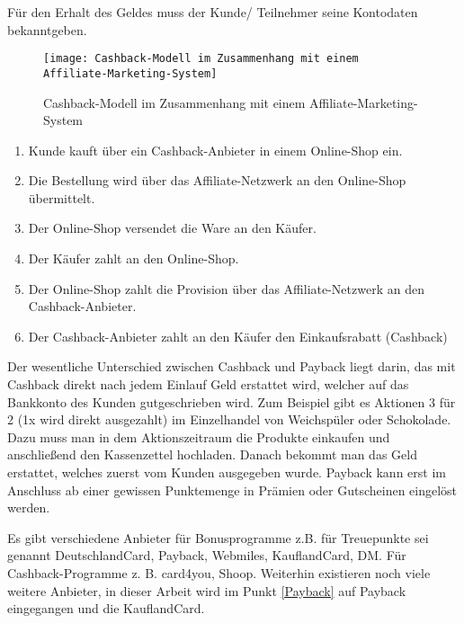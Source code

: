 \noindent Für den Erhalt des Geldes muss der Kunde/ Teilnehmer seine Kontodaten bekanntgeben. \cite{paycashback_all} \newline



\begin{figure}[!ht]
	\centering
	\texttt{[image: Cashback-Modell im Zusammenhang mit einem Affiliate-Marketing-System]}
	\caption{Cashback-Modell im Zusammenhang mit einem Affiliate-Marketing-System \cite{Bonus_affiliate} }
	\label{fig:Bonus_affiliate}
\end{figure}
\FloatBarrier

\begin{enumerate}
	\item Kunde kauft über ein Cashback-Anbieter in einem Online-Shop ein.
	\item Die Bestellung wird über das Affiliate-Netzwerk an den Online-Shop übermittelt.
	\item Der Online-Shop versendet die Ware an den Käufer.
	\item Der Käufer zahlt an den Online-Shop.
	\item Der Online-Shop zahlt die Provision über das Affiliate-Netzwerk an den Cashback-Anbieter.
	\item Der Cashback-Anbieter zahlt an den Käufer den Einkaufsrabatt (Cashback) \cite{Bonus_affiliate}
\end{enumerate}

\noindent Der wesentliche Unterschied zwischen Cashback und Payback liegt darin, das mit Cashback direkt nach jedem Einlauf Geld erstattet wird, welcher auf das Bankkonto des Kunden gutgeschrieben wird. Zum Beispiel gibt es Aktionen 3 für 2 (1x wird direkt ausgezahlt) im Einzelhandel von Weichspüler oder Schokolade. Dazu muss man in dem Aktionszeitraum die Produkte einkaufen und anschließend den Kassenzettel hochladen. Danach bekommt man das Geld erstattet, welches zuerst vom Kunden ausgegeben wurde. Payback kann erst im Anschluss ab einer gewissen Punktemenge in Prämien oder Gutscheinen eingelöst werden. \cite{TreueCash} \newline

\noindent Es gibt verschiedene Anbieter für Bonusprogramme z.B. für Treuepunkte sei genannt DeutschlandCard, Payback, Webmiles, KauflandCard, DM. Für Cashback-Programme z. B. card4you, Shoop. Weiterhin existieren noch viele weitere Anbieter, in dieser Arbeit wird im Punkt \ref{Payback} auf Payback eingegangen und die KauflandCard.

